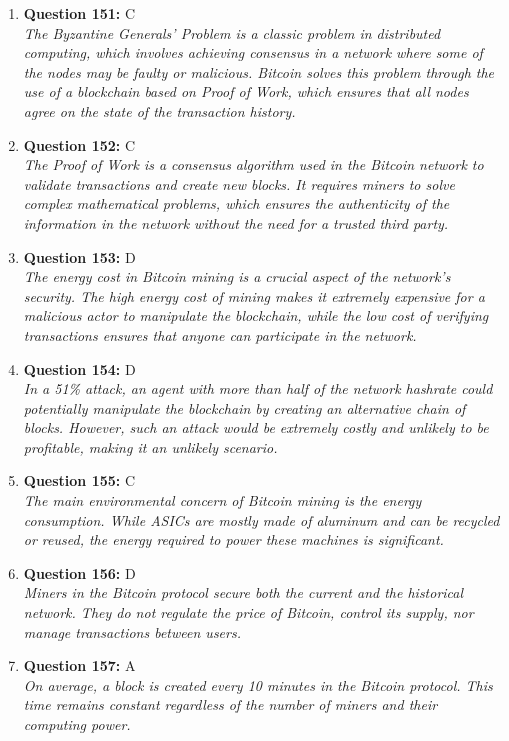 \documentclass[12pt,a4paper]{article}
\begin{document}
\begin{enumerate}
\item \textbf{Question 151:} C
\\ \textit{The Byzantine Generals' Problem is a classic problem in distributed computing, which involves achieving consensus in a network where some of the nodes may be faulty or malicious. Bitcoin solves this problem through the use of a blockchain based on Proof of Work, which ensures that all nodes agree on the state of the transaction history.}

\item \textbf{Question 152:} C
\\ \textit{The Proof of Work is a consensus algorithm used in the Bitcoin network to validate transactions and create new blocks. It requires miners to solve complex mathematical problems, which ensures the authenticity of the information in the network without the need for a trusted third party.}

\item \textbf{Question 153:} D
\\ \textit{The energy cost in Bitcoin mining is a crucial aspect of the network's security. The high energy cost of mining makes it extremely expensive for a malicious actor to manipulate the blockchain, while the low cost of verifying transactions ensures that anyone can participate in the network.}

\item \textbf{Question 154:} D
\\ \textit{In a 51\% attack, an agent with more than half of the network hashrate could potentially manipulate the blockchain by creating an alternative chain of blocks. However, such an attack would be extremely costly and unlikely to be profitable, making it an unlikely scenario.}

\item \textbf{Question 155:} C
\\ \textit{The main environmental concern of Bitcoin mining is the energy consumption. While ASICs are mostly made of aluminum and can be recycled or reused, the energy required to power these machines is significant.}

\item \textbf{Question 156:} D
\\ \textit{Miners in the Bitcoin protocol secure both the current and the historical network. They do not regulate the price of Bitcoin, control its supply, nor manage transactions between users.}

\item \textbf{Question 157:} A
\\ \textit{On average, a block is created every 10 minutes in the Bitcoin protocol. This time remains constant regardless of the number of miners and their computing power.}


\end{enumerate}
\end{document}
